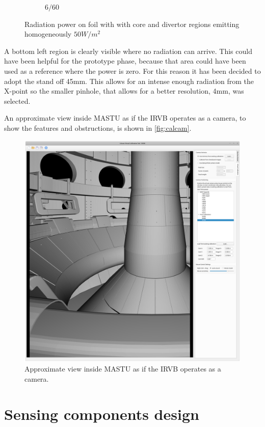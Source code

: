 \begin{figure}
\begin{subfigure}{0.50\textwidth}
         \caption{$6/60$}
         \label{fig:6_60_all}
     \end{subfigure}

    \caption{Radiation power on foil with with core and divertor regions emitting homogeneously $50W/m^2$}
    \label{fig:cherab2}
\end{figure}

A bottom left region is clearly visible where no radiation can arrive. This could have been helpful for the prototype phase, because that area could have been used as a reference where the power is zero.
For this reason it has been decided to adopt the stand off 45mm. This allows for an intense enough radiation from the X-point so the smaller pinhole, that allows for a better resolution, 4mm, was selected.

An approximate view inside MASTU as if the IRVB operates as a camera, to show the features and obstructions, is shown in \autoref{fig:calcam}.

\begin{figure}
	\centering
	\includegraphics[trim={30 10 450 85},clip,width=0.6\linewidth]{Chapters/chapter2/figs/calcam.png}
	\caption{Approximate view inside MASTU as if the IRVB operates as a camera.}
	\label{fig:calcam}
\end{figure}

\section{Sensing components design}\label{Sensing components design}

